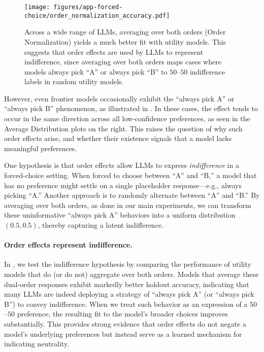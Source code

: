 \begin{wrapfigure}{r}{0.49\textwidth}
    \centering
    \texttt{[image: figures/app-forced-choice/order\_normalization\_accuracy.pdf]}
    \caption{Across a wide range of LLMs, averaging over both orders (Order Normalization) yields a much better fit with utility models. This suggests that order effects are used by LLMs to represent indifference, since averaging over both orders maps cases where models always pick ``A'' or always pick ``B'' to $50$--$50$ indifference labels in random utility models.}
    \label{fig:order_normalization_accuracy}
    \vspace{-20pt}
\end{wrapfigure}

However, even frontier models occasionally exhibit the ``always pick A'' or ``always pick B'' phenomenon, as illustrated in . In these cases, the effect tends to occur in the same direction across all low-confidence preferences, as seen in the Average Distribution plots on the right. This raises the question of why such order effects arise, and whether their existence signals that a model lacks meaningful preferences.

One hypothesis is that order effects allow LLMs to express \emph{indifference} in a forced-choice setting. When forced to choose between ``A'' and ``B,'' a model that has no preference might settle on a single placeholder response—e.g., always picking ``A.'' Another approach is to randomly alternate between ``A'' and ``B.'' By averaging over both orders, as done in our main experiments, we can transform these uninformative ``always pick A'' behaviors into a uniform distribution \((0.5, 0.5)\), thereby capturing a latent indifference.

\paragraph{Order effects represent indifference.}
In , we test the indifference hypothesis by comparing the performance of utility models that do (or do not) aggregate over both orders. Models that average these dual-order responses exhibit markedly better holdout accuracy, indicating that many LLMs are indeed deploying a strategy of ``always pick A'' (or ``always pick B'') to convey indifference. When we treat such behavior as an expression of a $50$--$50$ preference, the resulting fit to the model’s broader choices improves substantially. This provides strong evidence that order effects do not negate a model’s underlying preferences but instead serve as a learned mechanism for indicating neutrality.

